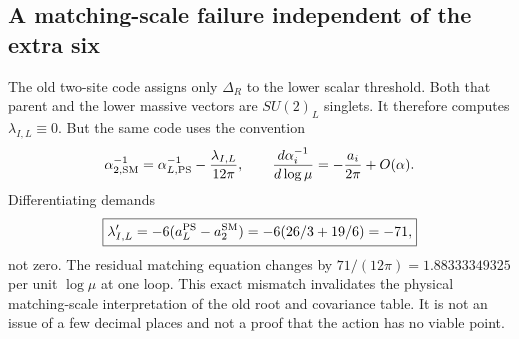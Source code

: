 \documentclass[11pt]{article}
\begin{document}
\subsection{A matching-scale failure independent of the extra six}
The old two-site code assigns only $\Delta_R$ to the lower scalar
threshold. Both that parent and the lower massive vectors are
$SU(2)_L$ singlets. It therefore computes $\lambda_{I,L}\equiv0$.
But the same code uses the convention
\begin{equation}
 \alpha_{2,\rm SM}^{-1}=\alpha_{L,\rm PS}^{-1}
 -\frac{\lambda_{I,L}}{12\pi},\qquad
 \frac{d\alpha_i^{-1}}{d\log\mu}=-\frac{a_i}{2\pi}+O(\alpha).
\end{equation}
Differentiating demands
\begin{equation}
 \boxed{\lambda'_{I,L}=-6(a_L^{\rm PS}-a_2^{\rm SM})
 =-6(26/3+19/6)=-71,}
\end{equation}
not zero. The residual matching equation changes by
$71/(12\pi)=1.88333349325$ per unit $\log\mu$ at one loop.
This exact mismatch invalidates the physical matching-scale interpretation
of the old root and covariance table. It is not an issue of a few decimal
places and not a proof that the action has no viable point.
\end{document}
